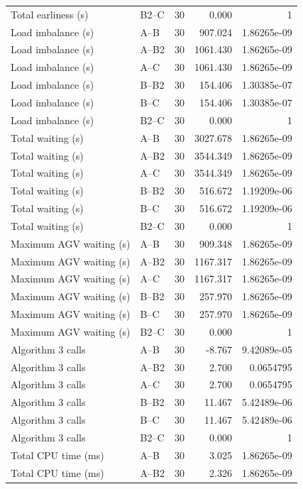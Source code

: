 \begin{table}[t]
\begin{tabular}{llrrr}
Total earliness (s) & B2--C & 30 & 0.000 & 1 \\
Load imbalance (s) & A--B & 30 & 907.024 & 1.86265e-09 \\
Load imbalance (s) & A--B2 & 30 & 1061.430 & 1.86265e-09 \\
Load imbalance (s) & A--C & 30 & 1061.430 & 1.86265e-09 \\
Load imbalance (s) & B--B2 & 30 & 154.406 & 1.30385e-07 \\
Load imbalance (s) & B--C & 30 & 154.406 & 1.30385e-07 \\
Load imbalance (s) & B2--C & 30 & 0.000 & 1 \\
Total waiting (s) & A--B & 30 & 3027.678 & 1.86265e-09 \\
Total waiting (s) & A--B2 & 30 & 3544.349 & 1.86265e-09 \\
Total waiting (s) & A--C & 30 & 3544.349 & 1.86265e-09 \\
Total waiting (s) & B--B2 & 30 & 516.672 & 1.19209e-06 \\
Total waiting (s) & B--C & 30 & 516.672 & 1.19209e-06 \\
Total waiting (s) & B2--C & 30 & 0.000 & 1 \\
Maximum AGV waiting (s) & A--B & 30 & 909.348 & 1.86265e-09 \\
Maximum AGV waiting (s) & A--B2 & 30 & 1167.317 & 1.86265e-09 \\
Maximum AGV waiting (s) & A--C & 30 & 1167.317 & 1.86265e-09 \\
Maximum AGV waiting (s) & B--B2 & 30 & 257.970 & 1.86265e-09 \\
Maximum AGV waiting (s) & B--C & 30 & 257.970 & 1.86265e-09 \\
Maximum AGV waiting (s) & B2--C & 30 & 0.000 & 1 \\
Algorithm 3 calls & A--B & 30 & -8.767 & 9.42089e-05 \\
Algorithm 3 calls & A--B2 & 30 & 2.700 & 0.0654795 \\
Algorithm 3 calls & A--C & 30 & 2.700 & 0.0654795 \\
Algorithm 3 calls & B--B2 & 30 & 11.467 & 5.42489e-06 \\
Algorithm 3 calls & B--C & 30 & 11.467 & 5.42489e-06 \\
Algorithm 3 calls & B2--C & 30 & 0.000 & 1 \\
Total CPU time (ms) & A--B & 30 & 3.025 & 1.86265e-09 \\
Total CPU time (ms) & A--B2 & 30 & 2.326 & 1.86265e-09 \\

\end{tabular}
\end{table}
